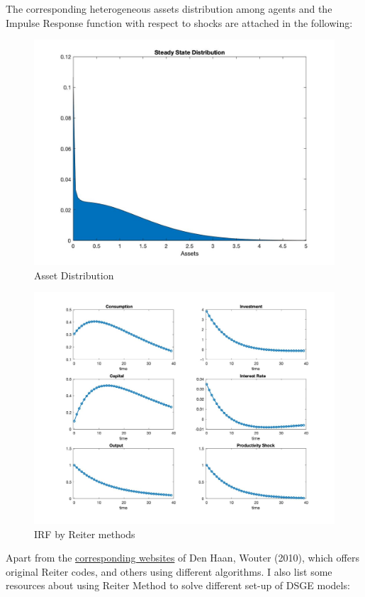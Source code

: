 The corresponding heterogeneous assets distribution among agents and the Impulse Response function with respect to shocks are attached in the following:

\begin{figure}[H]
\caption{Asset Distribution}
\hspace{-2.0cm}
\begin{center}
\includegraphics[angle=0,width=.67\textwidth]{img/1.jpg}
\end{center}
\end{figure}

\begin{figure}[H]
\caption{IRF by Reiter methods}
\hspace{-2.0cm}
\begin{center}
\includegraphics[angle=0,width=.67\textwidth]{img/2.jpg}
\end{center}
\end{figure}

Apart from the \href{http://www.wouterdenhaan.com/datasuite.htm}{corresponding websites} of Den Haan, Wouter (2010)\cite{den2010comparison}, which offers original Reiter codes, and others using different algorithms. I also list some resources about using Reiter Method to solve different set-up of DSGE models:

